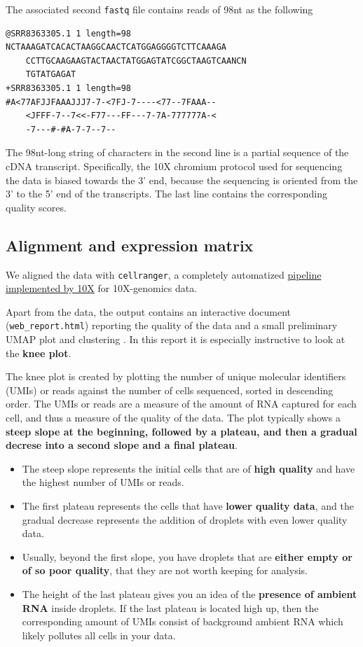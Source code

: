 \documentclass[
  letterpaper,
  DIV=11,
  numbers=noendperiod]{scrartcl}
\providecommand{\tightlist}{%
  \setlength{\itemsep}{0pt}\setlength{\parskip}{0pt}}\usepackage{longtable,booktabs,array}
\begin{document}
The associated second \texttt{fastq} file contains reads of 98nt as the
following

\begin{verbatim}
@SRR8363305.1 1 length=98
NCTAAAGATCACACTAAGGCAACTCATGGAGGGGTCTTCAAAGA
    CCTTGCAAGAAGTACTAACTATGGAGTATCGGCTAAGTCAANCN
    TGTATGAGAT
+SRR8363305.1 1 length=98
#A<77AFJJFAAAJJJ7-7-<7FJ-7----<77--7FAAA--
    <JFFF-7--7<<-F77---FF---7-7A-777777A-<
    -7---#-#A-7-7--7--
\end{verbatim}

The 98nt-long string of characters in the second line is a partial
sequence of the cDNA transcript. Specifically, the 10X chromium protocol
used for sequencing the data is biased towards the 3' end, because the
sequencing is oriented from the 3' to the 5' end of the transcripts. The
last line contains the corresponding quality scores.

\subsection{Alignment and expression
matrix}\label{alignment-and-expression-matrix}

We aligned the data with \texttt{cellranger}, a completely automatized
\href{https://support.10xgenomics.com/single-cell-gene-expression/software/pipelines/latest/what-is-cell-ranger}{pipeline
implemented by 10X} for 10X-genomics data.

Apart from the data, the output contains an interactive document
(\texttt{web\_report.html}) reporting the quality of the data and a
small preliminary UMAP plot and clustering . In this report it is
especially instructive to look at the \textbf{knee plot}.

The knee plot is created by plotting the number of unique molecular
identifiers (UMIs) or reads against the number of cells sequenced,
sorted in descending order. The UMIs or reads are a measure of the
amount of RNA captured for each cell, and thus a measure of the quality
of the data. The plot typically shows a \textbf{steep slope at the
beginning, followed by a plateau, and then a gradual decrese into a
second slope and a final plateau}.

\begin{itemize}
\tightlist
\item
  The steep slope represents the initial cells that are of \textbf{high
  quality} and have the highest number of UMIs or reads.
\item
  The first plateau represents the cells that have \textbf{lower quality
  data}, and the gradual decrease represents the addition of droplets
  with even lower quality data.
\item
  Usually, beyond the first slope, you have droplets that are
  \textbf{either empty or of so poor quality}, that they are not worth
  keeping for analysis.
\item
  The height of the last plateau gives you an idea of the
  \textbf{presence of ambient RNA} inside droplets. If the last plateau
  is located high up, then the corresponding amount of UMIs consist of
  background ambient RNA which likely pollutes all cells in your data.
\end{itemize}
\end{document}
